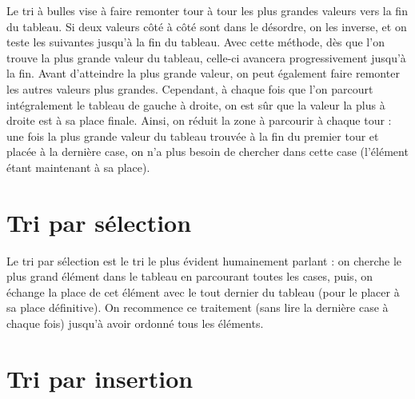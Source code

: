 \documentclass[11pt,a4paper]{article}
\begin{document}
Le tri à bulles vise à faire remonter tour à tour les plus grandes valeurs vers la fin du tableau.
Si deux valeurs côté à côté sont dans le désordre, on les inverse, et on teste les suivantes jusqu'à la fin du tableau.
Avec cette méthode, dès que l'on trouve la plus grande valeur du tableau, celle-ci avancera progressivement jusqu'à la fin.
Avant d'atteindre la plus grande valeur, on peut également faire remonter les autres valeurs plus grandes.
Cependant, à chaque fois que l'on parcourt intégralement le tableau de gauche à droite, on est sûr que la valeur la plus à droite est à sa place finale.
Ainsi, on réduit la zone à parcourir à chaque tour : une fois la plus grande valeur du tableau trouvée à la fin du premier tour et placée à la dernière case, on n'a plus besoin de chercher dans cette case (l'élément étant maintenant à sa place).

\bigskip



\bigskip


\section{Tri par sélection}

\medskip

Le tri par sélection est le tri le plus évident humainement parlant : on cherche le plus grand élément dans le tableau en parcourant toutes les cases, puis, on échange la place de cet élément avec le tout dernier du tableau (pour le placer à sa place définitive).
On recommence ce traitement (sans lire la dernière case à chaque fois) jusqu'à avoir ordonné tous les éléments.

\bigskip



\bigskip


\section{Tri par insertion}
\end{document}
